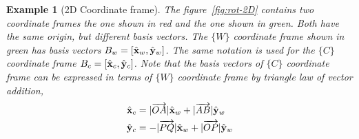 \documentclass[twocolumn]{article}
\newtheorem{exmpl}{Example}
\begin{document}
\begin{exmpl}[2D Coordinate frame]
  The figure~\ref{fig:rot-2D} contains two coordinate frames the one  shown  in
  red and   the one   shown in green. Both have  the  same origin, but
  different  basis vectors. The $\{W\}$ coordinate frame shown in green has
  basis vectors $B_w = [\hat{\mathbf{x}}_w, \hat{\mathbf{y}}_w]$. The same notation is used
  for the $\{C\}$ coordinate frame $B_c  =  [ \hat{\mathbf{x}}_c, \hat{\mathbf{y}}_c]$.
  Note that the basis vectors of $\{C\}$  coordinate frame  can be
  expressed  in  terms of $\{W\}$  coordinate frame by triangle  law of vector addition,
  \begin{equation}
  \begin{aligned}
    \hat{\mathbf{x}}_c &= |\overrightarrow{OA}|\hat{\mathbf{x}}_w + |\overrightarrow{AB}|\hat{\mathbf{y}}_w
    \\
    \hat{\mathbf{y}}_c &= -|\overrightarrow{PQ}|\hat{\mathbf{x}}_w + |\overrightarrow{OP}|\hat{\mathbf{y}}_w
  \end{aligned}
  \label{eq:c-as-w}
  \end{equation}


\end{exmpl}
\end{document}
